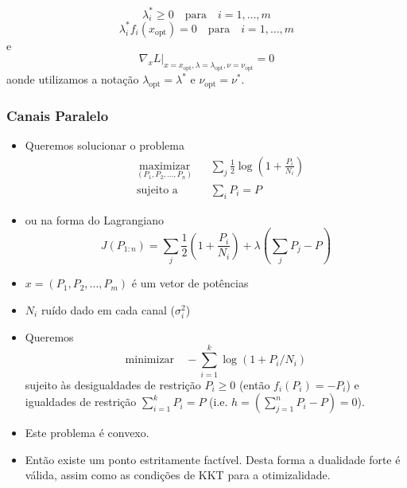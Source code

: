 \begin{frame}[allowframebreaks]
\begin{itemize}
\begin{equation}
        \lambda_i^\ast \geq 0 \quad \text{para} \quad i = 1, \ldots , m
        \end{equation}
        \begin{equation}
        \lambda_i^\ast f_i(x_{\text{opt}}) = 0 \quad \text{para} \quad i = 1, \ldots , m
        \end{equation}
	e
	\begin{equation}
	\nabla_x L \vert_{x = x_{\text{opt}}, \lambda = \lambda_{\text{opt}}, \nu = \nu_{\text{opt}}} = 0
        \end{equation}
	aonde utilizamos a notação $\lambda_{\text{opt}} = \lambda^\ast$ e $\nu_{\text{opt}} = \nu^\ast$.
  \end{itemize}
\end{frame}


\begin{frame}[allowframebreaks]
  \frametitle{Canais Paralelo}
  \begin{itemize}
  \item Queremos solucionar o problema
        \begin{equation}
        \begin{aligned}
        & \underset{(P_1, P_2, \ldots, P_n)}{\text{maximizar}}
        & & \sum_j \frac{1}{2} \log \left(1 + \frac{P_i}{N_i} \right) \\
        & \text{sujeito a} & & \sum_i P_i = P
        \end{aligned}
        \end{equation}

  \item ou na forma do Lagrangiano
        \begin{equation}
        J(P_{1:n}) = \sum_{j} \frac{1}{2} \left( 1 + \frac{P_i}{N_i} \right) + \lambda \left( \sum_{j} P_j - P \right)
        \end{equation}

  \item $x = (P_1, P_2, \ldots, P_m)$ é um vetor de potências
  \item $N_i$ ruído dado em cada canal ($\sigma_i^2$)
  \item Queremos
	\begin{equation}
	\text{minimizar} \quad - \sum_{i=1}^{k} \log (1 + P_i / N_i)
        \end{equation}
	sujeito às desigualdades de restrição $P_i \geq 0$ (então $f_i (P_i) = - P_i$) e
 	igualdades de restrição $\sum_{i=1}^{k} P_i = P$ (i.e. $h = (\sum_{j=1}^n P_i - P) = 0$).
  \item Este problema é convexo.
  \item Então existe um ponto estritamente factível. Desta forma a dualidade forte é válida, assim
	como as condições de KKT para a otimizalidade.
  \end{itemize}



\end{frame}
